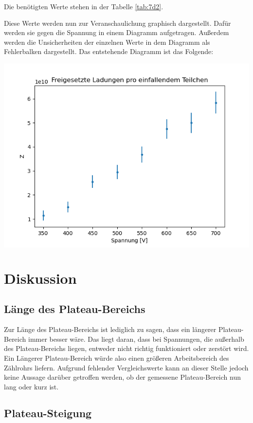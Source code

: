 \noindent Die benötigten Werte stehen in der Tabelle \ref{tab:7d2}.

\noindent Diese Werte werden nun zur Veranschaulichung graphisch dargestellt.
Dafür werden sie gegen die Spannung in einem Diagramm aufgetragen.
Außerdem werden die Unsicherheiten der einzelnen Werte in dem Diagramm als Fehlerbalken dargestellt.
Das entstehende Diagramm ist das Folgende:

\includegraphics{7d.png}


\section{Diskussion}

\subsection{Länge des Plateau-Bereichs}

Zur Länge des Plateau-Bereichs ist lediglich zu sagen,
dass ein längerer Plateau-Bereich immer besser wäre.
Das liegt daran, dass bei Spannungen,
die außerhalb des Plateau-Bereichs liegen,
entweder nicht richtig funktioniert oder zerstört wird.
Ein Längerer Plateau-Bereich würde also einen größeren Arbeitsbereich des Zählrohrs liefern.
Aufgrund fehlender Vergleichswerte kann an dieser Stelle jedoch keine Aussage darüber getroffen werden,
ob der gemessene Plateau-Bereich nun lang oder kurz ist.

\subsection{Plateau-Steigung}

